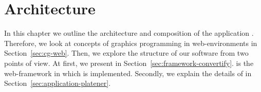 \documentclass[../ClassicThesis.tex]{subfiles}
\begin{document}
\chapter{Architecture}
\label{ch:architecture}

In this chapter we outline the architecture and composition of the
application {\platener}. Therefore, we look at concepts of graphics
programming in web-environments in Section~\ref{sec:cg-web}. Then, we
explore the structure of our software from two points of view. At
first, we present {\convertify} in
Section~\ref{sec:framework-convertify}. {\convertify} is the
web-framework in which {\platener} is implemented. Secondly, we
explain the details of {\platener} in
Section~\ref{sec:application-platener}.







\end{document}
